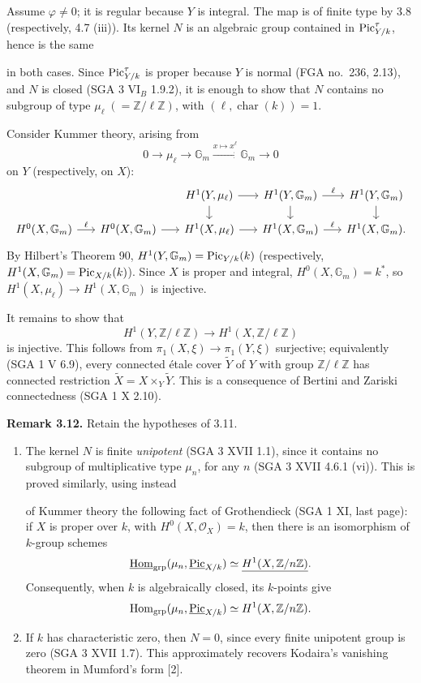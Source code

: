 Assume \(\varphi\ne0\); it is regular because \(Y\) is integral. The map
is of finite type by 3.8 (respectively, 4.7 (iii)). Its kernel \(N\) is
an algebraic group contained in \(\operatorname{Pic}^\tau_{Y/k}\), hence is the same

in both cases. Since \(\operatorname{Pic}^\tau_{Y/k}\) is proper because \(Y\) is
normal (FGA no.~236, 2.13), and \(N\) is closed (SGA 3 VI\(_B\) 1.9.2),
it is enough to show that \(N\) contains no subgroup of type
\(\mu_\ell\;(=\mathbb Z/\ell\mathbb Z)\), with
\((\ell,\operatorname{char}(k))=1\).

Consider Kummer theory, arising from
\[
0\longrightarrow\mu_\ell\longrightarrow\mathbb G_m
\xrightarrow{x\mapsto x^\ell}\mathbb G_m\longrightarrow0
\]
on \(Y\) (respectively, on \(X\)):
\[
\begin{tikzcd}[column sep=1.6em,row sep=1.2em]
&&H^1(Y,\mu_\ell)\arrow[r]\arrow[d]&
H^1(Y,\mathbb G_m)\arrow[r,"\ell"]\arrow[d]&
H^1(Y,\mathbb G_m)\arrow[d]\\
H^0(X,\mathbb G_m)\arrow[r,"\ell"]&
H^0(X,\mathbb G_m)\arrow[r]&
H^1(X,\mu_\ell)\arrow[r]&
H^1(X,\mathbb G_m)\arrow[r,"\ell"]&
H^1(X,\mathbb G_m).
\end{tikzcd}
\]
By Hilbert's Theorem 90, \(H^1(Y,\mathbb G_m)=\operatorname{Pic}_{Y/k}(k)\)
(respectively, \(H^1(X,\mathbb G_m)=\operatorname{Pic}_{X/k}(k)\)). Since \(X\) is
proper and integral, \(H^0(X,\mathbb G_m)=k^*\), so
\(H^1(X,\mu_\ell)\to H^1(X,\mathbb G_m)\) is injective.

It remains to show that
\[
H^1(Y,\mathbb Z/\ell\mathbb Z)\longrightarrow
H^1(X,\mathbb Z/\ell\mathbb Z)
\]
is injective. This follows from \(\pi_1(X,\xi)\to\pi_1(Y,\xi)\)
surjective; equivalently (SGA 1 V 6.9), every connected \'etale cover
\(\widetilde Y\) of \(Y\) with group \(\mathbb Z/\ell\mathbb Z\) has
connected restriction \(\widetilde X=X\times_Y\widetilde Y\). This is a
consequence of Bertini and Zariski connectedness (SGA 1 X 2.10).

\textbf{Remark 3.12.} Retain the hypotheses of 3.11.
\begin{enumerate}[label=(\roman*)]
\item The kernel \(N\) is finite \emph{unipotent} (SGA 3 XVII 1.1),
since it contains no subgroup of multiplicative type \(\mu_n\), for any
\(n\) (SGA 3 XVII 4.6.1 (vi)). This is proved similarly, using instead

of Kummer theory the following fact of Grothendieck (SGA 1 XI, last
page): if \(X\) is proper over \(k\), with \(H^0(X,\mathcal O_X)=k\),
then there is an isomorphism of \(k\)-group schemes
\[
\underline{\operatorname{Hom}}_{\mathrm{grp}}
(\mu_n,\underline{\operatorname{Pic}}_{X/k})
\simeq \underline{H^1(X,\mathbb Z/n\mathbb Z)}.
\]
Consequently, when \(k\) is algebraically closed, its \(k\)-points give
\[
\operatorname{Hom}_{\mathrm{grp}}(\mu_n,\underline{\operatorname{Pic}}_{X/k})
\simeq H^1(X,\mathbb Z/n\mathbb Z).
\]
\item If \(k\) has characteristic zero, then \(N=0\), since every finite
unipotent group is zero (SGA 3 XVII 1.7). This approximately recovers
Kodaira's vanishing theorem in Mumford's form [2].
\end{enumerate}

